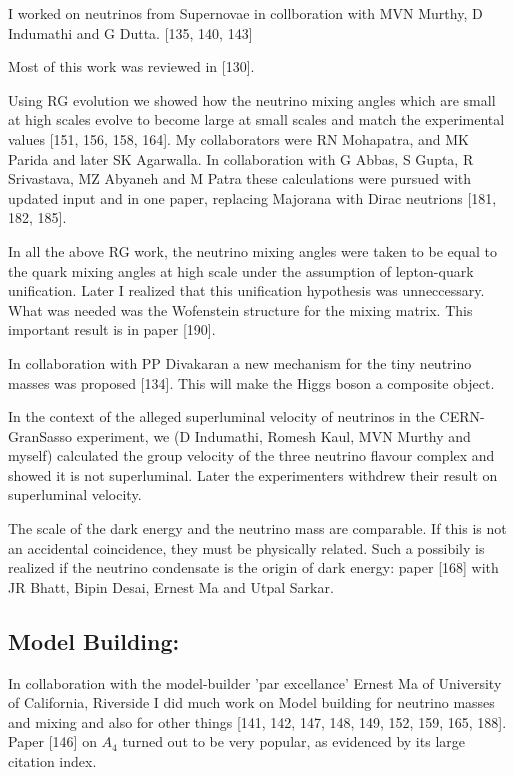I worked on neutrinos from Supernovae in collboration with MVN Murthy, D 
Indumathi and G Dutta. [135, 140, 143]

Most of this work was reviewed in [130].

Using RG evolution we showed how the neutrino mixing angles which are 
small at high scales evolve to become large at small scales and match 
the experimental values [151, 156, 158, 164]. My collaborators were RN 
Mohapatra, and MK Parida and later SK Agarwalla. In collaboration with G 
Abbas, S Gupta, R Srivastava, MZ Abyaneh and M Patra these calculations 
were pursued with updated input and in one paper, replacing Majorana with 
Dirac neutrions [181, 182, 185].

In all the above RG work, the neutrino mixing angles were taken to be 
equal to the quark mixing angles at high scale under the assumption of 
lepton-quark unification. Later I realized that this unification 
hypothesis was unneccessary. What was needed was the Wofenstein 
structure for the mixing matrix. This impor\-tant result is in paper 
[190].

In collaboration with PP Divakaran a new mechanism for the tiny neutrino 
masses was proposed [134]. This will make the Higgs boson a composite 
object.

In the context of the alleged superluminal velocity of neutrinos in the 
CERN-GranSasso experiment, we (D Indumathi, Ro\-mesh Kaul, MVN Murthy and 
myself) calculated the group velocity of the three neutrino flavour 
complex and showed it is not superluminal. Later the experimenters 
withdrew their result on superluminal velocity.

The scale of the dark energy and the neutrino mass are comparable. If 
this is not an accidental coincidence, they must be physically related. 
Such a possibily is realized if the neutrino condensate is the origin of 
dark energy: paper [168] with JR Bha\-tt, Bipin Desai, Ernest Ma and Utpal 
Sarkar.

\subsection*{Model Building:}

In collaboration with the model-builder 'par excellance' Ernest Ma of 
University of California, Riverside I did much work on Model building 
for neutrino masses and mixing and also for other things 
[141, 142, 147, 148, 149, 152, 159, 165, 188]. Paper [146] on $A_4$ turned out to 
be very popular, as evidenced by its large citation index.

